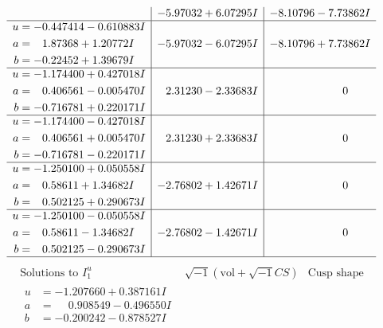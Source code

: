 \documentclass[1p]{elsarticle_modified}
\theoremstyle{definition}
\newcommand{\I}{\sqrt{-1}}
\begin{document}
$$\begin{array}{c|c|c}
 & -5.97032 + 6.07295 I & -8.10796 - 7.73862 I \\ \hline\begin{aligned}
u &= -0.447414 - 0.610883 I \\
a &= \phantom{-}1.87368 + 1.20772 I \\
b &= -0.22452 + 1.39679 I\end{aligned}
 & -5.97032 - 6.07295 I & -8.10796 + 7.73862 I \\ \hline\begin{aligned}
u &= -1.174400 + 0.427018 I \\
a &= \phantom{-}0.406561 - 0.005470 I \\
b &= -0.716781 + 0.220171 I\end{aligned}
 & \phantom{-}2.31230 - 2.33683 I & \phantom{-0.000000 } 0 \\ \hline\begin{aligned}
u &= -1.174400 - 0.427018 I \\
a &= \phantom{-}0.406561 + 0.005470 I \\
b &= -0.716781 - 0.220171 I\end{aligned}
 & \phantom{-}2.31230 + 2.33683 I & \phantom{-0.000000 } 0 \\ \hline\begin{aligned}
u &= -1.250100 + 0.050558 I \\
a &= \phantom{-}0.58611 + 1.34682 I \\
b &= \phantom{-}0.502125 + 0.290673 I\end{aligned}
 & -2.76802 + 1.42671 I & \phantom{-0.000000 } 0 \\ \hline\begin{aligned}
u &= -1.250100 - 0.050558 I \\
a &= \phantom{-}0.58611 - 1.34682 I \\
b &= \phantom{-}0.502125 - 0.290673 I\end{aligned}
 & -2.76802 - 1.42671 I & \phantom{-0.000000 } 0\\
 \hline 
 \end{array}$$\newpage$$\begin{array}{c|c|c}  
\text{Solutions to }I^u_{1}& \I (\text{vol} + \sqrt{-1}CS) & \text{Cusp shape}\\
 \hline 
\begin{aligned}
u &= -1.207660 + 0.387161 I \\
a &= \phantom{-}0.908549 - 0.496550 I \\
b &= -0.200242 - 0.878527 I\end{aligned}

\end{array}$$
\end{document}
